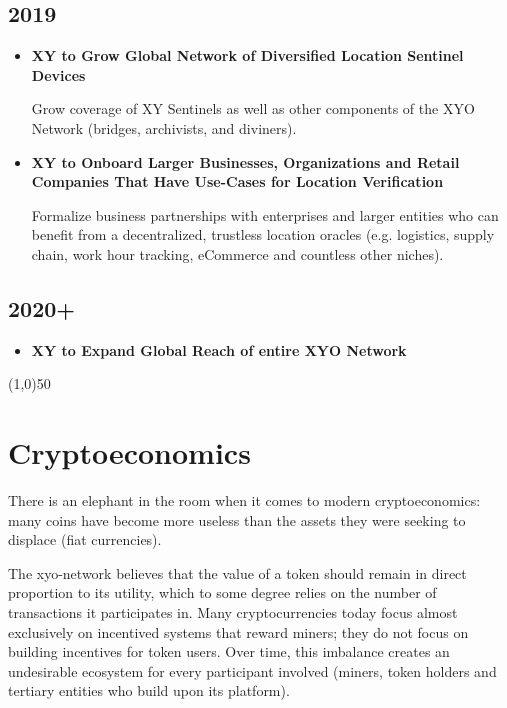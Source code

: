 \documentclass{article}
\begin{document}
\subsection{2019}
\begin{itemize}
\item \textbf{XY to Grow Global Network of Diversified Location Sentinel Devices}

Grow coverage of XY Sentinels as well as other components of the XYO Network (\Glspl{bridge}, \Glspl{archivist}, and \Glspl{diviner}).

\item \textbf{XY to Onboard Larger Businesses, Organizations and Retail Companies That Have Use-Cases for Location Verification}

Formalize business partnerships with enterprises and larger entities who can benefit from a decentralized, \gls{trustless} location \glspl{oracle} (e.g. logistics, supply chain, work hour tracking, eCommerce and countless other niches).

\end{itemize}

\subsection{2020+}
\begin{itemize}
\item \textbf{XY to Expand Global Reach of entire XYO Network}
\end{itemize}

\begin{center}
\line(1,0){50}
\end{center}

\section{Cryptoeconomics}

There is an elephant in the room when it comes to modern \gls{cryptoeconomics}: many coins have become more useless than the assets they were seeking to displace (fiat currencies).

The \Gls{xyo-network} believes that the value of a token should remain in direct proportion to its utility, which to some degree relies on the number of transactions it participates in. Many cryptocurrencies today focus almost exclusively on incentived systems that reward miners; they do not focus on building incentives for token users. Over time, this imbalance creates an undesirable ecosystem for every participant involved (miners, token holders and tertiary entities who build upon its platform).
\end{document}
